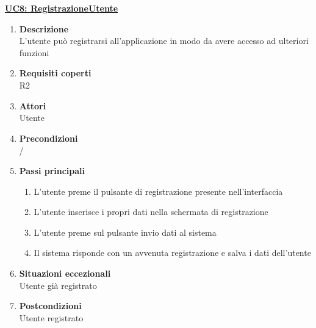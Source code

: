 \underline{\textbf{UC8: RegistrazioneUtente}}
\begin{enumerate}
\item\textbf{Descrizione}\\
L'utente può registrarsi all'applicazione in modo da avere accesso ad ulteriori funzioni
\item\textbf{Requisiti coperti}\\
R2
\item\textbf{Attori}\\
Utente
\item\textbf{Precondizioni}\\ /
\item\textbf{Passi principali}
\begin{enumerate}
\item L'utente preme il pulsante di registrazione presente nell'interfaccia
\item L'utente inserisce i propri dati nella schermata di registrazione
\item L'utente preme sul pulsante invio dati al sistema
\item Il sistema risponde con un avvenuta registrazione e salva i dati dell'utente
\end{enumerate}
\item\textbf{Situazioni eccezionali}\\
Utente già registrato
\item\textbf{Postcondizioni}\\
Utente registrato 
\end{enumerate}

